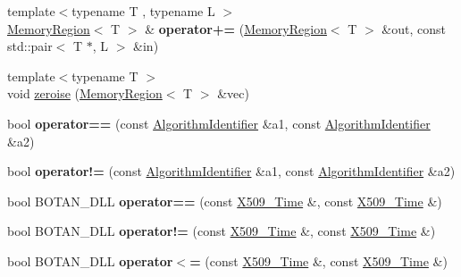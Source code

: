 \begin{DoxyCompactItemize}
\item 
\hypertarget{namespaceBotan_a7cf8fef5ef4cbbf358d48bc86e8e0039}{{\footnotesize template$<$typename T , typename L $>$ }\\\hyperlink{classBotan_1_1MemoryRegion}{Memory\-Region}$<$ T $>$ \& {\bfseries operator+=} (\hyperlink{classBotan_1_1MemoryRegion}{Memory\-Region}$<$ T $>$ \&out, const std\-::pair$<$ T $\ast$, L $>$ \&in)}\label{namespaceBotan_a7cf8fef5ef4cbbf358d48bc86e8e0039}

\item 
{\footnotesize template$<$typename T $>$ }\\void \hyperlink{namespaceBotan_a1124974770f4457453f01b33383f56d8}{zeroise} (\hyperlink{classBotan_1_1MemoryRegion}{Memory\-Region}$<$ T $>$ \&vec)
\item 
\hypertarget{namespaceBotan_a180e281cb90043710e8f6b6f9872ae84}{bool {\bfseries operator==} (const \hyperlink{classBotan_1_1AlgorithmIdentifier}{Algorithm\-Identifier} \&a1, const \hyperlink{classBotan_1_1AlgorithmIdentifier}{Algorithm\-Identifier} \&a2)}\label{namespaceBotan_a180e281cb90043710e8f6b6f9872ae84}

\item 
\hypertarget{namespaceBotan_a1204a3ec474e7f716e34cec00ee3baea}{bool {\bfseries operator!=} (const \hyperlink{classBotan_1_1AlgorithmIdentifier}{Algorithm\-Identifier} \&a1, const \hyperlink{classBotan_1_1AlgorithmIdentifier}{Algorithm\-Identifier} \&a2)}\label{namespaceBotan_a1204a3ec474e7f716e34cec00ee3baea}

\item 
\hypertarget{namespaceBotan_a9a0c07a98b9f92983001a35523a7c19b}{bool B\-O\-T\-A\-N\-\_\-\-D\-L\-L {\bfseries operator==} (const \hyperlink{classBotan_1_1X509__Time}{X509\-\_\-\-Time} \&, const \hyperlink{classBotan_1_1X509__Time}{X509\-\_\-\-Time} \&)}\label{namespaceBotan_a9a0c07a98b9f92983001a35523a7c19b}

\item 
\hypertarget{namespaceBotan_a769abbaed08e0415f3d8294aa3f83658}{bool B\-O\-T\-A\-N\-\_\-\-D\-L\-L {\bfseries operator!=} (const \hyperlink{classBotan_1_1X509__Time}{X509\-\_\-\-Time} \&, const \hyperlink{classBotan_1_1X509__Time}{X509\-\_\-\-Time} \&)}\label{namespaceBotan_a769abbaed08e0415f3d8294aa3f83658}

\item 
\hypertarget{namespaceBotan_ab8ee8cf5a661a2d9633c79dd72d35b51}{bool B\-O\-T\-A\-N\-\_\-\-D\-L\-L {\bfseries operator$<$=} (const \hyperlink{classBotan_1_1X509__Time}{X509\-\_\-\-Time} \&, const \hyperlink{classBotan_1_1X509__Time}{X509\-\_\-\-Time} \&)}\label{namespaceBotan_ab8ee8cf5a661a2d9633c79dd72d35b51}


\end{DoxyCompactItemize}
